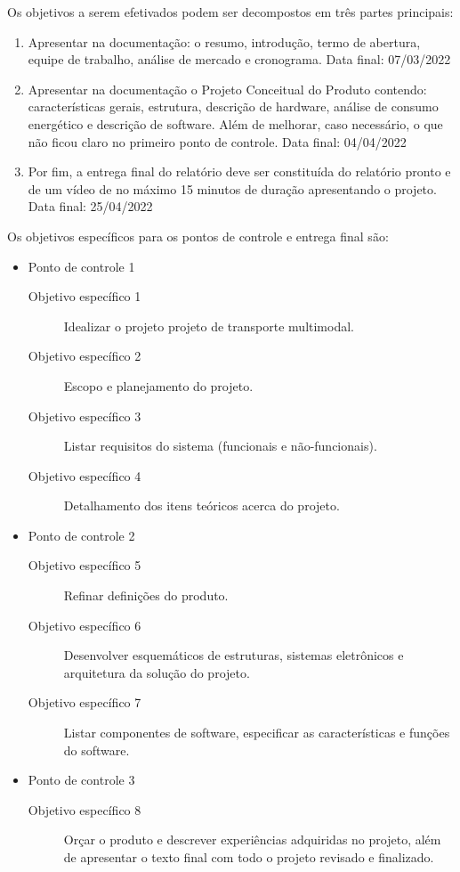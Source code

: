 Os objetivos a serem efetivados podem ser decompostos em três partes principais:

\begin{enumerate}
    \item Apresentar na documentação: o resumo, introdução, termo de abertura, equipe de trabalho, análise de mercado e cronograma. Data final: 07/03/2022
    \item Apresentar na documentação o Projeto Conceitual do Produto contendo: características gerais, estrutura, descrição de hardware, análise de consumo energético e descrição de software. Além de melhorar, caso necessário, o que não ficou claro no primeiro ponto de controle. Data final: 04/04/2022
    \item Por fim, a entrega final do relatório deve ser constituída do relatório pronto e de um vídeo de no máximo 15 minutos de duração apresentando o projeto. Data final: 25/04/2022
\end{enumerate}

Os objetivos específicos para os pontos de controle e entrega final são:

\begin{itemize}
    \item Ponto de controle 1
          \begin{description}
              \item[Objetivo específico 1] Idealizar o projeto projeto de transporte multimodal.
              \item[Objetivo específico 2] Escopo e planejamento do projeto.
              \item[Objetivo específico 3] Listar requisitos do sistema (funcionais e não-funcionais).
              \item[Objetivo específico 4] Detalhamento dos itens teóricos acerca do projeto.
          \end{description}
    \item Ponto de controle 2
          \begin{description}
              \item[Objetivo específico 5] Refinar definições do produto.
              \item[Objetivo específico 6] Desenvolver esquemáticos de estruturas, sistemas eletrônicos e arquitetura da solução do projeto.
              \item[Objetivo específico 7] Listar componentes de software, especificar as características e funções do software.
          \end{description}
    \item Ponto de controle 3
          \begin{description}
              \item[Objetivo específico 8] Orçar o produto e descrever experiências adquiridas no projeto, além de apresentar o texto final com todo o projeto revisado e finalizado.
          \end{description}
\end{itemize}
